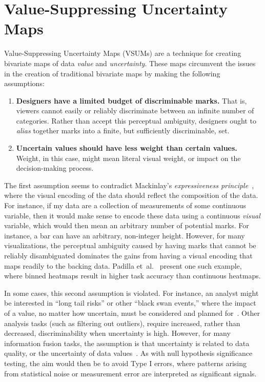 \documentclass{vgtc}                          %
\newcommand{\ea}{{et~al.}\xspace}
\begin{document}
\section{Value-Suppressing Uncertainty Maps}

Value-Suppressing Uncertainty Maps (VSUMs) are a technique for creating bivariate maps of data \emph{value} and \emph{uncertainty}. These maps circumvent the issues in the creation of traditional bivariate maps by making the following assumptions:

\begin{enumerate}
	\item \textbf{Designers have a limited budget of discriminable marks.} That is, viewers cannot easily or reliably discriminate between an infinite number of categories. Rather than accept this perceptual ambiguity, designers ought to \emph{alias} together marks into a finite, but sufficiently discriminable, set.
	\item \textbf{Uncertain values should have less weight than certain values.} Weight, in this case, might mean literal visual weight, or impact on the decision-making process.
\end{enumerate}

The first assumption seems to contradict Mackinlay's \emph{expressiveness principle}~\cite{mackinlay1986automating}, where the visual encoding of the data should reflect the composition of the data. For instance, if my data are a collection of measurements of some continuous variable, then it would make sense to encode these data using a continuous \emph{visual} variable, which would then mean an arbitrary number of potential marks. For instance, a bar can have an arbitrary, non-integer height. However, for many visualizations, the perceptual ambiguity caused by having marks that cannot be reliably disambiguated dominates the gains from having a visual encoding that maps readily to the backing data. Padilla \ea~\cite{padilla2017evaluating} present one such example, where binned heatmaps result in higher task accuracy than continuous heatmaps.

In some cases, this second assumption is violated. For instance, an analyst might be interested in ``long tail risks'' or other ``black swan events,'' where the impact of a value, no matter how uncertain, must be considered and planned for~\cite{taleb2011black}. Other analysis tasks (such as filtering out outliers), require increased, rather than decreased, discriminability when uncertainty is high. However, for many information fusion tasks, the assumption is that uncertainty is related to data quality, or the uncertainty of data values~\cite{riveiro2007evaluation}. As with null hypothesis significance testing, the aim would then be to avoid Type I errors, where patterns arising from statistical noise or measurement error are interpreted as significant signals.
\end{document}
